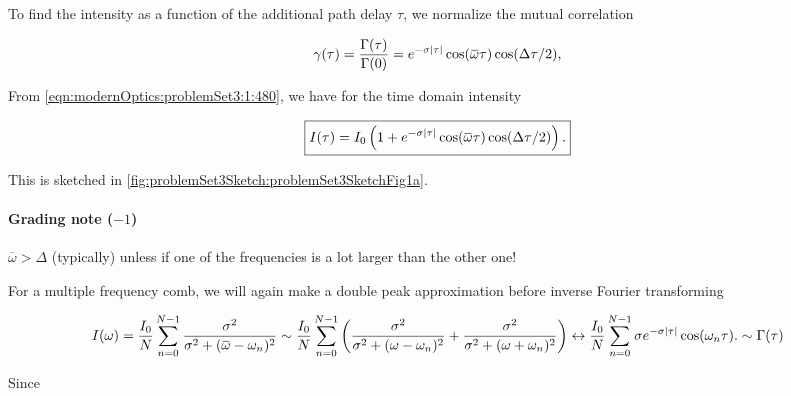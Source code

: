 {To find the intensity as a function of the additional path delay $\tau$, we normalize the mutual correlation

\begin{dmath}\label{eqn:modernOptics:problemSet3:1:440}
\gamma(\tau) 
= \frac{\Gamma(\tau)}{\Gamma(0)}
=
e^{-\sigma \Abs{\tau}} 
\cos( \overbar{\omega} \tau ) \cos ( \Delta \tau /2 ),
\end{dmath}

From \ref{eqn:modernOptics:problemSet3:1:480}, we have for the time domain intensity 

\begin{dmath}\label{eqn:modernOptics:problemSet3:1:460}
\boxed{
I(\tau) = I_0 
\left( 1 + 
e^{-\sigma \Abs{\tau}} 
\cos( \overbar{\omega} \tau ) \cos ( \Delta \tau /2 )
\right).
}
\end{dmath}

This is sketched in \cref{fig:problemSet3Sketch:problemSet3SketchFig1a}.

\paragraph{Grading note ($-1$)}
$\overbar{\omega} > \Delta$ (typically) unless if one of the frequencies is a lot larger than the other one!




For a multiple frequency comb, we will again make a double peak approximation before inverse Fourier transforming

\begin{dmath}\label{eqn:modernOptics:problemSet3:1:500}
I(\omega) 
= 
\frac{I_0}{N} \sum_{n = 0}^{N-1} \frac{\sigma^2}{\sigma^2 + (\overbar{\omega} - \omega_n)^2}
\sim
\frac{I_0}{N} \sum_{n = 0}^{N-1} 
\left(
\frac{\sigma^2}{\sigma^2 + (\omega - \omega_n)^2}
+\frac{\sigma^2}{\sigma^2 + (\omega + \omega_n)^2}
\right)
\leftrightarrow
\frac{I_0}{N} \sum_{n = 0}^{N-1} 
\sigma e^{-\sigma \Abs{\tau} } \cos(\omega_n \tau).
\sim \Gamma(\tau)
\end{dmath}

Since

}
